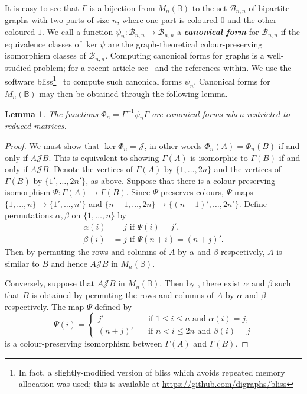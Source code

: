 \documentclass[11pt]{article}
\newtheorem{lemma}[thm]{Lemma}
\newcommand{\defn}[1]{\textbf{\textit{#1}}}
\numberwithin{equation}{section}
\renewcommand{\to}{\longrightarrow}
\newcommand{\B}{\mathbb{B}}
\newcommand{\Bn}{M_n(\B)}
\newcommand{\J}{\mathscr{J}}
\newcommand{\BGSet}{\mathcal{B}_{n,n}}
\begin{document}
It is easy to see that $\Gamma$ is a bijection from $\Bn$ to the set $\BGSet$ of
bipartite graphs with two parts of size $n$, where one part is coloured $0$ and
the other coloured $1$. We call a function $\psi_n: \BGSet \to \BGSet$ a
\defn{canonical form} for $\BGSet$ if the equivalence classes of $\ker\psi$ are
the graph-theoretical colour-preserving isomorphism classes of $\BGSet$.
Computing canonical forms for graphs is a well-studied problem; for a recent
article see~\cite{McKay2014aa} and the references within.
We use the software bliss\footnote{In fact, a slightly-modified version of bliss
  which avoids repeated memory allocation was used; this is available at
  \url{https://github.com/digraphs/bliss}}~\cite{Junttila2007aa, Bliss} to
compute such canonical forms $\psi_n$. Canonical forms for $\Bn$ may then be
obtained through the following lemma.
\begin{lemma}
  The functions $\Phi_n = \Gamma^{-1}\psi_n\Gamma$ are canonical forms when
  restricted to reduced matrices. 
\end{lemma}
\begin{proof}
  We must show that $\ker\Phi_n = \J$, in other words $\Phi_n(A) = \Phi_n(B)$ if and
  only if $A\J B$. This is equivalent to showing $\Gamma(A)$ is isomorphic to
  $\Gamma(B)$ if and only if $A \J B$. Denote the vertices of $\Gamma(A)$ by
  $\{1, \ldots, 2 n\}$ and the vertices of $\Gamma(B)$ by $\{1', \ldots, 2n'\}$,
  as above.
  Suppose that there is a colour-preserving isomorphism $\Psi: \Gamma(A) \to
  \Gamma(B)$. Since $\Psi$ preserves colours, $\Psi$ maps $\{1, \ldots, n\} \to
  \{1', \ldots, n'\}$ and $\{n + 1, \ldots, 2n\} \to \{(n + 1)', \ldots, 2n'\}$.
  Define permutations $\alpha, \beta$ on $\{1,\ldots, n\}$ by 
  \begin{align*}
    \alpha(i) &= j \text{ if } \Psi(i) = j',\\
    \beta(i)  &= j \text{ if } \Psi(n + i) = (n + j)'.
  \end{align*}
  Then by permuting the rows and columns of $A$ by $\alpha$ and $\beta$
  respectively, $A$ is similar to $B$ and hence $A \J B$ in $\Bn$.

  Conversely, suppose that $A \J B$ in $\Bn$. Then by
  , there exist $\alpha$ and $\beta$ such
  that $B$ is obtained by permuting the rows and columns of $A$ by $\alpha$ and $\beta$
  respectively. The map $\Psi$ defined by
  \[\Psi(i) = \begin{cases}
      j' \quad &\text{if } 1 \leq i \leq n \text{ and }\alpha(i) = j, \\
      (n + j)' \quad &\text{if } n < i \leq 2n \text{ and }\beta(i) = j
    \end{cases}
  \]
  is a colour-preserving isomorphism between $\Gamma(A)$ and $\Gamma(B)$.
\end{proof}
\end{document}
